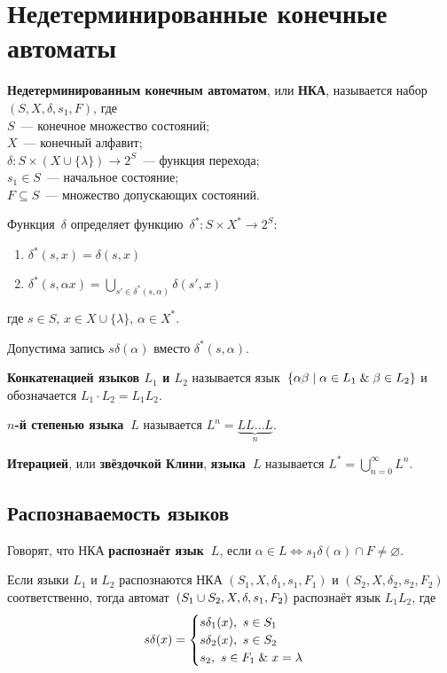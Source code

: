 \section{Недетерминированные конечные автоматы}
  \textbf{Недетерминированным конечным автоматом}, или \textbf{НКА}, называется набор~$(S, X, \delta, s_1, F)$, где\\
$S$~--- конечное множество состояний;\\
$X$~--- конечный алфавит;\\
$\delta \colon S \times (X \cup \{ \lambda \}) \to 2^S$~--- функция перехода;\\
$s_1 \in S$~--- начальное состояние;\\
$F \subseteq S$~--- множество допускающих состояний.

Функция~$\delta$ определяет функцию~$\delta^* \colon S \times X^* \to 2^S$:
\begin{enumerate}
	\item $\delta^*(s, x) = \delta(s, x)$
	\item $\delta^*(s, \alpha x) = \bigcup\limits_{s' \in \delta^*(s, \alpha)} \delta(s', x)$
\end{enumerate}
где $s \in S$, $x \in X \cup \{ \lambda \}$, $\alpha \in X^*$.

Допустима запись $s \delta(\alpha)$ вместо $\delta^*(s, \alpha)$.

 \textbf{Конкатенацией языков $L_1$ и $L_2$} называется язык~$\{ \alpha \beta \mid \alpha \in L_1 \mathrel{\&} \beta \in L_2 \}$ и обозначается $L_1 \cdot L_2 = L_1 L_2$.

 \textbf{$n$-й степенью языка~$L$} называется $L^n = \underbrace{L L \ldots L}_n$.

  \textbf{Итерацией}, или \textbf{звёздочкой Клини}, \textbf{языка~$L$} называется $L^* = \bigcup\limits_{n=0}^\infty L^n$.

\subsection{Распознаваемость языков}
Говорят, что НКА \textbf{распознаёт язык~$L$}, если $\alpha \in L \Leftrightarrow s_1 \delta(\alpha) \cap F \neq \varnothing$.

Если языки $L_1$ и $L_2$ распознаются НКА $(S_1, X, \delta_1, s_1, F_1)$ и $(S_2, X, \delta_2, s_2, F_2)$ соответственно, тогда автомат~$(S_1 \opbr\cup S_2, \allowbreak X, \allowbreak \delta, \allowbreak s_1, \allowbreak F_2)$ распознаёт язык $L_1 L_2$, где
\begin{equation*}
s \delta(x) =
\begin{cases}
s \delta_1(x), \ s \in S_1 \\
s \delta_2(x), \ s \in S_2 \\
s_2, \ s \in F_1 \mathrel{\&} x = \lambda
\end{cases}
\end{equation*}

